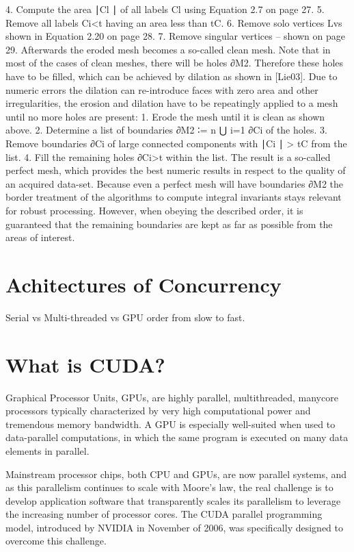 \documentclass[openany]{book}
\begin{document}
4. Compute the area ∣Cl ∣ of all labels Cl using Equation 2.7 on page 27.
5. Remove all labels Ci<t having an area less than tC.
6. Remove solo vertices Lvs shown in Equation 2.20 on page 28.
7. Remove singular vertices – shown on page 29.
Afterwards the eroded mesh becomes a so-called clean mesh. Note that in most of 
the cases of clean meshes, there will be holes ∂M2. Therefore these holes have 
to be filled, which can be achieved by dilation as shown in [Lie03]. Due to 
numeric errors the dilation can re-introduce faces with zero area and other 
irregularities, the erosion and dilation have to be repeatingly applied to a mesh 
until no more holes are present:
1. Erode the mesh until it is clean as shown above.
2. Determine a list of boundaries ∂M2 ∶= n ⋃ i=1 ∂Ci of the holes.
3. Remove boundaries ∂Ci of large connected components with ∣Ci ∣ > tC from the 
list.
4. Fill the remaining holes ∂Ci>t within the list.
The result is a so-called perfect mesh, which provides the best numeric results 
in respect to the quality of an acquired data-set. Because even a perfect mesh 
will have boundaries ∂M2 the border treatment of the algorithms to compute 
integral invariants stays relevant for robust processing. However, when obeying 
the described order, it is guaranteed that the remaining boundaries are kept as 
far as possible from the areas of interest.~\cite[p.~120]{Mara12}



\section{Achitectures of Concurrency}
Serial vs Multi-threaded vs GPU order from slow to fast.~\cite[p.~00]{SourceNeeded}



\section{What is CUDA?}
Graphical Processor Units, GPUs, are highly parallel, multithreaded, manycore 
processors typically characterized by very high computational power and 
tremendous memory bandwidth. A GPU is especially well-suited when used to 
data-parallel computations, in which the same program is executed on many data 
elements in parallel.~\cite[p.~1.1]{CUDA18}

Mainstream processor chips, both CPU and GPUs, are now parallel systems, and as 
this parallelism continues to scale with Moore's law, the real challenge is to 
develop application software that transparently scales its parallelism to 
leverage the increasing number of processor cores. The CUDA parallel 
programming model, introduced by NVIDIA in November of 2006, was specifically 
designed to overcome this challenge.~\cite[p.~1.3]{CUDA18}
\end{document}
